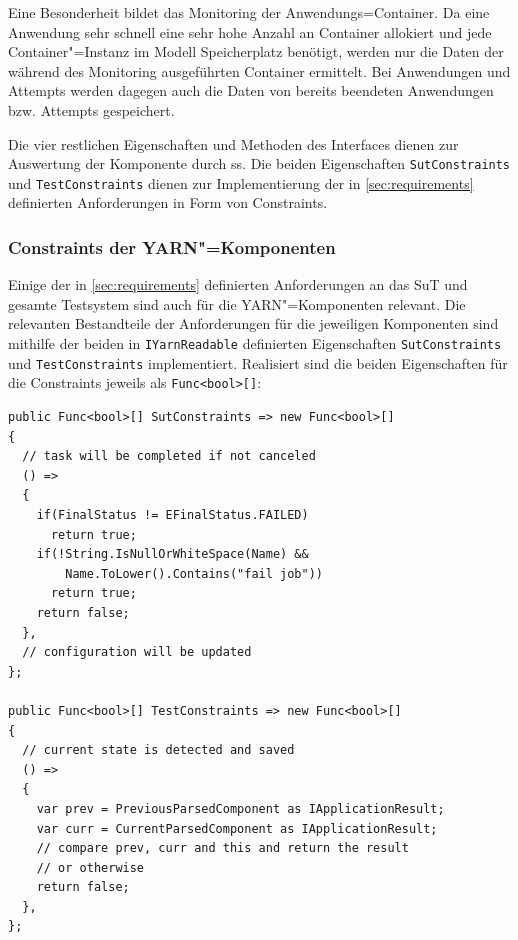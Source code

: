 Eine Besonderheit bildet das Monitoring der Anwendungs=Container.
Da eine Anwendung sehr schnell eine sehr hohe Anzahl an Container allokiert und jede Container"=Instanz im Modell Speicherplatz benötigt, werden nur die Daten der während des Monitoring ausgeführten Container ermittelt.
Bei Anwendungen und Attempts werden dagegen auch die Daten von bereits beendeten Anwendungen bzw. Attempts gespeichert.

Die vier restlichen Eigenschaften und Methoden des Interfaces dienen zur Auswertung der Komponente durch \ac{ss}.
Die beiden Eigenschaften \texttt{SutConstraints} und \texttt{TestConstraints} dienen zur Implementierung der in \cref{sec:requirements} definierten Anforderungen in Form von Constraints.

\subsubsection{Constraints der \acs{YARN}"=Komponenten}
\label{subsubsec:yarnComponentConstraints}

Einige der in \cref{sec:requirements} definierten Anforderungen an das \ac{SuT} und gesamte Testsystem sind auch für die \ac{YARN}"=Komponenten relevant.
Die relevanten Bestandteile der Anforderungen für die jeweiligen Komponenten sind mithilfe der beiden in \texttt{IYarnReadable} definierten Eigenschaften \texttt{SutConstraints} und \texttt{TestConstraints} implementiert.
Realisiert sind die beiden Eigenschaften für die Constraints jeweils als \texttt{Func<bool>[]}:

\begin{lstlisting}[label=lst:constraintDefinition,style=cs,
caption={[Definition der Constraints in YarnApp]
    Definition der Constraints in \texttt{YarnApp} (gekürzt)}]
public Func<bool>[] SutConstraints => new Func<bool>[]
{
  // task will be completed if not canceled
  () =>
  {
    if(FinalStatus != EFinalStatus.FAILED)
      return true;
    if(!String.IsNullOrWhiteSpace(Name) &&
        Name.ToLower().Contains("fail job"))
      return true;
    return false;
  },
  // configuration will be updated
};

public Func<bool>[] TestConstraints => new Func<bool>[]
{
  // current state is detected and saved
  () =>
  {
    var prev = PreviousParsedComponent as IApplicationResult;
    var curr = CurrentParsedComponent as IApplicationResult;
    // compare prev, curr and this and return the result
    // or otherwise
    return false;
  },
};
\end{lstlisting}

